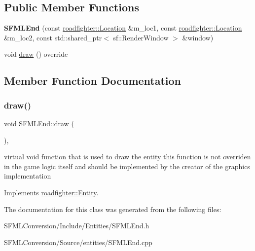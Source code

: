 \subsection*{Public Member Functions}
\begin{DoxyCompactItemize}
\item 
\mbox{\label{classSFMLEnd_acf2db930f449f1995d98216fffdea1ec}} 
{\bfseries S\+F\+M\+L\+End} (const \hyperlink{classroadfighter_1_1Location}{roadfighter\+::\+Location} \&m\+\_\+loc1, const \hyperlink{classroadfighter_1_1Location}{roadfighter\+::\+Location} \&m\+\_\+loc2, const std\+::shared\+\_\+ptr$<$ sf\+::\+Render\+Window $>$ \&window)
\item 
void \hyperlink{classSFMLEnd_aee51982a63f9c1c6495f539528683989}{draw} () override
\end{DoxyCompactItemize}


\subsection{Member Function Documentation}
\mbox{\label{classSFMLEnd_aee51982a63f9c1c6495f539528683989}} 
\subsubsection{\texorpdfstring{draw()}{draw()}}
{\footnotesize\ttfamily void S\+F\+M\+L\+End\+::draw (\begin{DoxyParamCaption}{ }\end{DoxyParamCaption})\hspace{0.3cm}{\ttfamily [override]}, {\ttfamily [virtual]}}

virtual void function that is used to draw the entity this function is not overriden in the game logic itself and should be implemented by the creator of the graphics implementation 

Implements \hyperlink{classroadfighter_1_1Entity_ac516f8005f969ad5a86c252e5a3640ee}{roadfighter\+::\+Entity}.



The documentation for this class was generated from the following files\+:\begin{DoxyCompactItemize}
\item 
S\+F\+M\+L\+Conversion/\+Include/\+Entities/S\+F\+M\+L\+End.\+h\item 
S\+F\+M\+L\+Conversion/\+Source/entities/S\+F\+M\+L\+End.\+cpp\end{DoxyCompactItemize}
